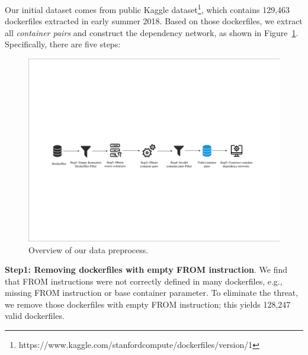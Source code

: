 \documentclass[sigconf]{acmart}
\begin{document}
Our initial dataset comes from public Kaggle dataset\footnote{https://www.kaggle.com/stanfordcompute/dockerfiles/version/1}, 
which contains 129,463 dockerfiles extracted in early summer 2018. 
Based on those dockerfiles, we extract all \emph{container pairs} and construct the dependency network, as shown in Figure~\ref{fig:process}.    %
Specifically, there are five steps: 
\begin{figure}[h!]
\centering
\includegraphics[width=1\columnwidth]{picture/Dataset_process3.pdf}\vspace{-0.3cm}
\caption{Overview of our data preprocess.}\vspace{-0.3cm}
\label{fig:process}
\end{figure}



\noindent\textbf{Step1: Removing dockerfiles with empty FROM instruction}. We find that FROM instructions were not correctly defined in many dockerfiles, e.g., missing FROM instruction or base container parameter. %
To eliminate the threat, we remove those dockerfiles with empty FROM instruction; this yields 128,247 valid dockerfiles.
\end{document}

